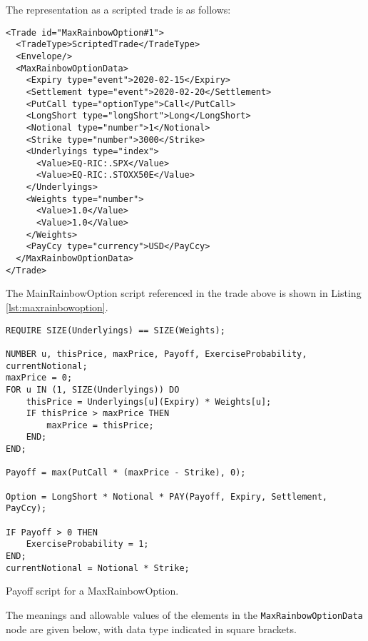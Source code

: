 The representation as a scripted trade is as follows:

\begin{verbatim}
<Trade id="MaxRainbowOption#1">
  <TradeType>ScriptedTrade</TradeType>
  <Envelope/>
  <MaxRainbowOptionData>
    <Expiry type="event">2020-02-15</Expiry>
    <Settlement type="event">2020-02-20</Settlement>
    <PutCall type="optionType">Call</PutCall>
    <LongShort type="longShort">Long</LongShort>
    <Notional type="number">1</Notional>
    <Strike type="number">3000</Strike>
    <Underlyings type="index">
      <Value>EQ-RIC:.SPX</Value>
      <Value>EQ-RIC:.STOXX50E</Value>
    </Underlyings>
    <Weights type="number">
      <Value>1.0</Value>
      <Value>1.0</Value>
    </Weights>
    <PayCcy type="currency">USD</PayCcy>
  </MaxRainbowOptionData>
</Trade>
\end{verbatim}

The MainRainbowOption script referenced in the trade above is
shown in Listing \ref{lst:maxrainbowoption}.

\begin{listing}[hbt]
\begin{verbatim}
REQUIRE SIZE(Underlyings) == SIZE(Weights);

NUMBER u, thisPrice, maxPrice, Payoff, ExerciseProbability, currentNotional;
maxPrice = 0;
FOR u IN (1, SIZE(Underlyings)) DO
    thisPrice = Underlyings[u](Expiry) * Weights[u];
    IF thisPrice > maxPrice THEN
        maxPrice = thisPrice;
    END;
END;

Payoff = max(PutCall * (maxPrice - Strike), 0);

Option = LongShort * Notional * PAY(Payoff, Expiry, Settlement, PayCcy);

IF Payoff > 0 THEN
    ExerciseProbability = 1;
END;
currentNotional = Notional * Strike;
\end{verbatim}
\caption{Payoff script for a MaxRainbowOption.}
\label{lst:maxrainbowoption}
\end{listing}

The meanings and allowable values of the elements in the
\lstinline!MaxRainbowOptionData! node are given below, with data
type indicated in square brackets.

